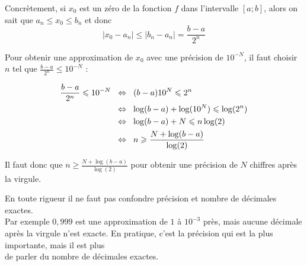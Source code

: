 \documentclass[11pt,a4paper,twoside,greek]{report}
\begin{document}
\medskip
Concrètement, si $x_0$ est un zéro de la fonction $f$ dans l'intervalle $[a;b]$, alors on sait que $a_n \leqslant x_0 \leqslant b_n$ et donc $$|x_0-a_n| \leqslant |b_n-a_n| = \frac{b-a}{2^n}$$

Pour obtenir une approximation de $x_0$ avec une précision de $10^{-N}$, il faut choisir $n$ tel que  $\frac{b-a}{2^n} \leqslant 10^{-N}$ :

\setlength{\jot}{3mm}
\hspace*{2cm}\begin{minipage}{0.6\textwidth}\begin{align*}
\frac{b-a}{2^n} \leqslant 10^{-N}
 & \ssi[2] (b-a)10^N \leqslant 2^n  \\
 & \ssi[2] \log(b-a) + \log(10^N)  \leqslant \log(2^n) \\
 & \ssi[2] \log(b-a) + N \leqslant n \log(2) \\
 & \ssi[2] n \geqslant \frac{N +  \log(b-a)}{\log(2)} \\
\end{align*}\end{minipage}

\vspace{-2mm}
Il faut donc que $n \geqslant \frac{N +  \log(b-a)}{\log(2)}$ pour obtenir une précision de $N$ chiffres après la virgule. 
%

\bigskip
\begin{remarque}
En toute rigueur il ne faut pas confondre précision et nombre de décimales exactes.\\
Par exemple $0,999$ est une approximation de $1$ à $10^{-3}$ près, mais aucune
décimale après la virgule n'est exacte.  En pratique, c'est la précision qui est la plus importante, mais il est plus\\  de parler du nombre de décimales exactes.
\end{remarque}
\end{document}
